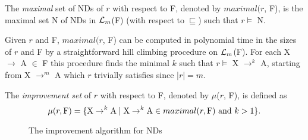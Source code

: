 \medskip

\begin{definition}
\begin{rm}
The {\em maximal} set of NDs of $r$ with respect to F,
denoted by $maximal(r$, F), is the maximal set N of NDs
in ${\cal L}_m$(F) (with respect to $\sqsubseteq$) such that $r \models$ N.
\end{rm}
\end{definition}
\medskip

Given $r$ and F, $maximal(r$, F) can be computed in polynomial time in the
sizes of $r$ and F by a straightforward hill climbing procedure
on ${\cal L}_m$(F). For each X $\to$ A $\in$ F this procedure finds 
the minimal $k$ such that $r \models$ X $\to^k$ A, starting 
from X $\to^m$ A which $r$ trivially satisfies since $\mid r \mid = m$. 


\begin{definition}
\begin{rm}
The {\em improvement set} of $r$ with respect to F, 
denoted by $\mu$($r$, F), is defined as 
\begin{displaymath}
\mu(r, {\rm F}) = \{{\rm X} \to^k {\rm A} \mid 
{\rm X} \to^k {\rm A} \in maximal(r, {\rm F}) \mbox{ and }  k > 1\}.
\end{displaymath}
\end{rm}
\end{definition}
\medskip


{\renewcommand{\baselinestretch}{1}
\begin{figure}[ht]
\begin{center}
\end{center}
\caption{\label{numdep:fig:mu} The improvement algorithm for NDs}
\end{figure}
}


